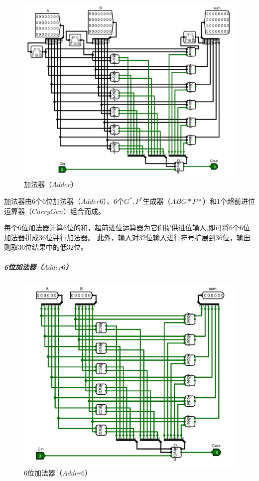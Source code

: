 \documentclass[main.tex]{subfiles}
\begin{document}
\begin{figure}[H]
\centering
\includegraphics[width=\textwidth]{images/Adder-circuit.png}
\caption{加法器（$Adder$）}
\end{figure}

加法器由6个6位加法器（$Adder6$）、6个$G^*, P^*$生成器（$ABG*P*$）和1个超前进位运算器（$CarryGen$）组合而成。

每个6位加法器计算6位的和，超前进位运算器为它们提供进位输入,即可将6个6位加法器拼成36位并行加法器。
此外，输入对32位输入进行符号扩展到36位，输出则取36位结果中的低32位。



\subparagraph{6位加法器（$Adder6$）} 

\begin{figure}[H]
\centering
\includegraphics[width=\textwidth]{images/Adder6-circuit.png}
\caption{6位加法器（$Adder6$）}
\end{figure}
\end{document}
